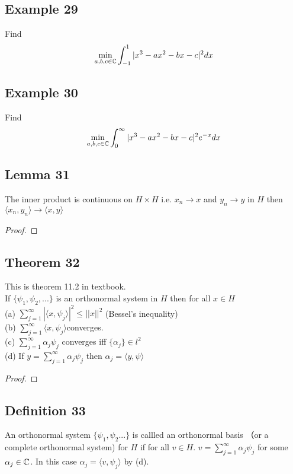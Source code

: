 \documentclass{article}
\begin{document}
\subsection* {Example 29}
Find 
\[ 
\min_{a,b,c\in \Bbb{C}}\int_{-1}^{1}|x^3-ax^2-bx-c|^2 dx
\]

\subsection* {Example 30}
Find
\[
\min_{a,b,c\in\Bbb{C}} \int_{0}^{\infty}|x^3-ax^2-bx-c|^2 e^{-x}dx
\]

\subsection* {Lemma 31}
The inner product is continuous on $H\times H$ i.e. $x_n \rightarrow x$ and $y_n \rightarrow y$ in $H$ then $\langle x_n, y_n \rangle \rightarrow \langle x, y \rangle$

\begin{proof}
\end{proof}

\subsection* {Theorem 32}
This is theorem 11.2 in textbook.\\
If $\{ \psi_1, \psi_2,...\}$ is an orthonormal system in $H$ then for all $x \in H $\\
(a) $\sum_{j=1}^{\infty} |\langle x,\psi_j \rangle|^2 \leq ||x||^2$ (Bessel's inequality)\\
(b) $\sum_{j=1}^{\infty} \langle x, \psi_j \rangle $converges.\\
(c) $\sum_{j=1}^{\infty} \alpha_j \psi_j $ converges iff $\{\alpha_j\} \in l^2$\\
(d) If $y = \sum_{j=1}^{\infty} \alpha_j \psi_j $ then $\alpha_j = \langle y,\psi \rangle$\\

\begin{proof}
\end{proof}

\subsection * {Definition 33}
An orthonormal system $\{\psi_1, \psi_2... \}$ is callled an orthonormal basis （or a complete orthonormal system) for  $H$ if for all $v\in H$. $v = \sum_{j=1}^{\infty} \alpha_j \psi_j$ for some $\alpha_j \in \Bbb{C}$. In this case $\alpha_j =\langle v, \psi_j \rangle$ by (d).
\end{document}
